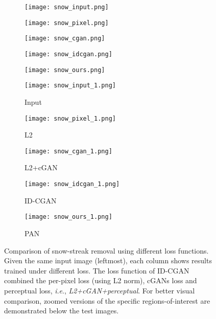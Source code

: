 \documentclass{article}
\newcommand{\ie}{\textit{i}.\textit{e}.}
\begin{document}
\begin{figure}
\captionsetup[subfigure]{labelformat=empty}
\centering
 \begin{subfigure}[b]{0.19\textwidth}
    \texttt{[image: snow\_input.png]}%
    \label{fig_first_case}
 \end{subfigure}
 \begin{subfigure}[b]{0.19\textwidth}
    \texttt{[image: snow\_pixel.png]}%
    \label{fig_second_case}
 \end{subfigure}
 \begin{subfigure}[b]{0.19\textwidth}
    \texttt{[image: snow\_cgan.png]}%
    \label{fig_first_case}
 \end{subfigure}
 \begin{subfigure}[b]{0.19\textwidth}
    \texttt{[image: snow\_idcgan.png]}%
    \label{fig_first_case}
 \end{subfigure}
 \begin{subfigure}[b]{0.19\textwidth}
    \texttt{[image: snow\_ours.png]}%
    \label{fig_first_case}
 \end{subfigure}
 \begin{subfigure}[b]{0.19\textwidth}
    \texttt{[image: snow\_input\_1.png]}
    \caption{Input}
    \label{fig_first_case}
 \end{subfigure}
 \begin{subfigure}[b]{0.19\textwidth}
    \texttt{[image: snow\_pixel\_1.png]}
    \caption{L2}
    \label{fig_second_case}
 \end{subfigure}
 \begin{subfigure}[b]{0.19\textwidth}
    \texttt{[image: snow\_cgan\_1.png]}
    \caption{L2+cGAN}
    \label{fig_first_case}
 \end{subfigure}
 \begin{subfigure}[b]{0.19\textwidth}
    \texttt{[image: snow\_idcgan\_1.png]}
    \caption{ID-CGAN}
    \label{fig_first_case}
 \end{subfigure}
 \begin{subfigure}[b]{0.19\textwidth}
    \texttt{[image: snow\_ours\_1.png]}
    \caption{PAN}
    \label{fig_first_case}
 \end{subfigure}
\caption{Comparison of snow-streak removal using different loss functions. Given the same input image (leftmost), each column shows results trained under different loss. The loss function of ID-CGAN~\cite{zhang2017image} combined the per-pixel loss (using L2 norm), cGANs loss and perceptual loss, \ie, \emph{L2+cGAN+perceptual}. For better visual comparison, zoomed versions of the specific regions-of-interest are demonstrated below the test images.}
\label{derain_real}
\end{figure}
\end{document}

